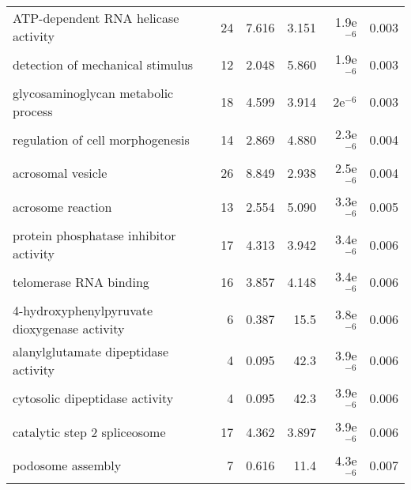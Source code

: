\begin{longtable}{lrrrrr}
               ATP-dependent RNA helicase activity &                      24 &                   7.616 &      3.151 &          1.9e$^{-6}$ &                0.003 \\
                  detection of mechanical stimulus &                      12 &                   2.048 &      5.860 &          1.9e$^{-6}$ &                0.003 \\
               glycosaminoglycan metabolic process &                      18 &                   4.599 &      3.914 &            2e$^{-6}$ &                0.003 \\
                  regulation of cell morphogenesis &                      14 &                   2.869 &      4.880 &          2.3e$^{-6}$ &                0.004 \\
                                 acrosomal vesicle &                      26 &                   8.849 &      2.938 &          2.5e$^{-6}$ &                0.004 \\
                                 acrosome reaction &                      13 &                   2.554 &      5.090 &          3.3e$^{-6}$ &                0.005 \\
            protein phosphatase inhibitor activity &                      17 &                   4.313 &      3.942 &          3.4e$^{-6}$ &                0.006 \\
                            telomerase RNA binding &                      16 &                   3.857 &      4.148 &          3.4e$^{-6}$ &                0.006 \\
      4-hydroxyphenylpyruvate dioxygenase activity &                       6 &                   0.387 &       15.5 &          3.8e$^{-6}$ &                0.006 \\
              alanylglutamate dipeptidase activity &                       4 &                   0.095 &       42.3 &          3.9e$^{-6}$ &                0.006 \\
                    cytosolic dipeptidase activity &                       4 &                   0.095 &       42.3 &          3.9e$^{-6}$ &                0.006 \\
                      catalytic step 2 spliceosome &                      17 &                   4.362 &      3.897 &          3.9e$^{-6}$ &                0.006 \\
                                 podosome assembly &                       7 &                   0.616 &       11.4 &          4.3e$^{-6}$ &                0.007 \\

\end{longtable}
